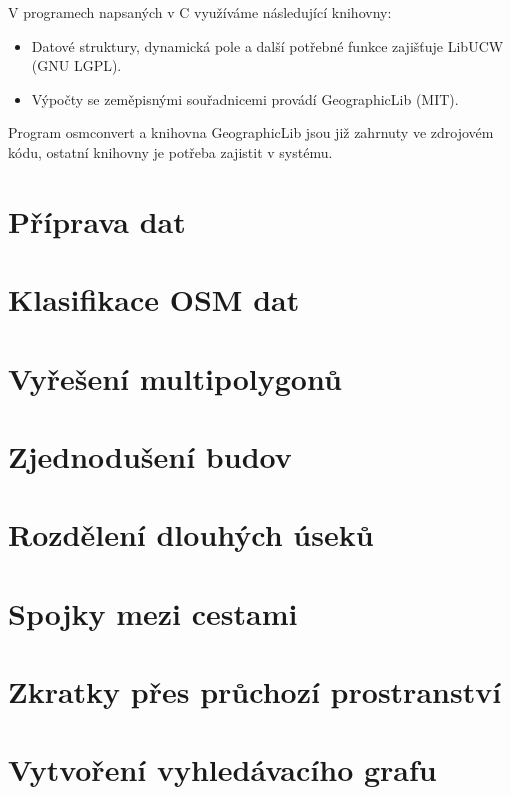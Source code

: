 \noindent V programech napsaných v C využíváme následující knihovny:
\begin{itemize}
	\item Datové struktury, dynamická pole a další potřebné funkce zajišťuje
	{\tuc LibUCW} (GNU LGPL).
	\item Výpočty se zeměpisnými souřadnicemi provádí {\tuc GeographicLib}
	(MIT).
\end{itemize}

Program osmconvert a knihovna GeographicLib jsou již zahrnuty ve zdrojovém kódu,
ostatní knihovny je potřeba zajistit v systému.

\section{Příprava dat}

\section{Klasifikace OSM dat}
\section{Vyřešení multipolygonů}
\section{Zjednodušení budov}
\section{Rozdělení dlouhých úseků}
\section{Spojky mezi cestami}
\section{Zkratky přes průchozí prostranství}
\section{Vytvoření vyhledávacího grafu}
